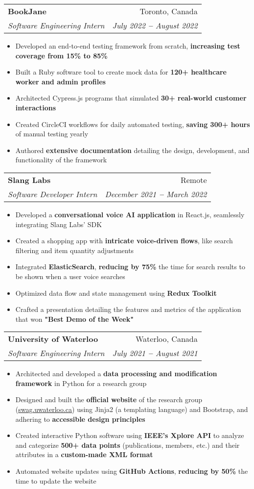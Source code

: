 \documentclass[letterpaper,11pt]{article}
\makeatletter
\newcommand{\resumeItem}[1]{
  \item\small{
    {#1 \vspace{-2pt}}
  }
}
\newcommand{\resumeSubheading}[4]{
  \vspace{-2pt}\item
    \begin{tabular*}{0.97\textwidth}[t]{l@{\extracolsep{\fill}}r}
      \textbf{#1} & #2 \\
      \textit{\small#3} & \textit{\small #4} \\
    \end{tabular*}\vspace{-7pt}
}
\newcommand{\resumeItemListStart}{\begin{itemize}}
\newcommand{\resumeItemListEnd}{\end{itemize}\vspace{-5pt}}
\makeatother
\begin{document}
    \resumeSubheading
      {BookJane} {Toronto, Canada}
      {Software Engineering Intern} {July 2022 \textbf{--} August 2022}
        \resumeItemListStart
            \resumeItem{Developed an end-to-end testing framework from scratch, \textbf{increasing test coverage from 15\% to 85\%}}
            \resumeItem{Built a Ruby software tool to create mock data for \textbf{120+ healthcare worker and admin profiles}}
            \resumeItem{Architected Cypress.js programs that simulated \textbf{30+ real-world customer interactions}}
            \resumeItem{Created CircleCI workflows for daily automated testing, \textbf{saving 300+ hours} of manual testing yearly}
            \resumeItem{Authored \textbf{extensive documentation} detailing the design, development, and functionality of the framework}
        \resumeItemListEnd

    \resumeSubheading
      {Slang Labs} {Remote}
      {Software Developer Intern} {December 2021 \textbf{--} March 2022}
        \resumeItemListStart
          \resumeItem{Developed a \textbf{conversational voice AI application} in React.js, seamlessly integrating Slang Labs' SDK}
          \resumeItem{Created a shopping app with \textbf{intricate voice-driven flows}, like search filtering and item quantity adjustments}
          \resumeItem{Integrated \textbf{ElasticSearch}, \textbf{reducing by 75\%} the time for search results to be shown when a user voice searches}
          \resumeItem{Optimized data flow and state management using \textbf{Redux Toolkit}}
          \resumeItem{Crafted a presentation detailing the features and metrics of the application that won \textbf{"Best Demo of the Week"}}
        \resumeItemListEnd
    
    \resumeSubheading
      {University of Waterloo} {Waterloo, Canada}
      {Software Engineering Intern} {July 2021 \textbf{--} August 2021}
        \resumeItemListStart
            \resumeItem{Architected and developed a \textbf{data processing and modification framework} in Python for a research group}
            \resumeItem{Designed and built the \textbf{official website} of the research group (\href{https://swag.uwaterloo.ca/members}{swag.uwaterloo.ca}) using Jinja2 (a templating language) and Bootstrap, and adhering to \textbf{accessible design principles}}
            \resumeItem{Created interactive Python software using \textbf{IEEE’s Xplore API} to analyze and categorize \textbf{500+ data points} (publications, members, etc.) and their attributes in a \textbf{custom-made XML format}}
            \resumeItem{Automated website updates using \textbf{GitHub Actions}, \textbf{reducing by 50\%} the time to update the website}
        \resumeItemListEnd
    
\end{document}
